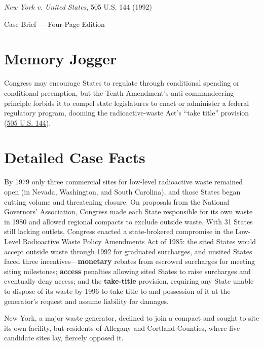 \documentclass[12pt]{article}
\begin{document}
\begin{center}
{\LARGE \textit{New York v. United States}, 505 U.S. 144 (1992)\par}
\vspace{0.8em}
{\large Case Brief --- Four-Page Edition\par}
\end{center}
\vspace{1em}

\section{Memory Jogger}

Congress may encourage States to regulate through conditional spending or conditional preemption, but the Tenth Amendment's anti-commandeering principle forbids it to compel state legislatures to enact or administer a federal regulatory program, dooming the radioactive-waste Act's ``take title'' provision (\href{https://www.courtlistener.com/opinion/112768/new-york-v-united-states/}{505 U.S. 144}).

\section{Detailed Case Facts}

By 1979 only three commercial sites for low-level radioactive waste remained open (in Nevada, Washington, and South Carolina), and those States began cutting volume and threatening closure. On proposals from the National Governors' Association, Congress made each State responsible for its own waste in 1980 and allowed regional compacts to exclude outside waste. With 31 States still lacking outlets, Congress enacted a state-brokered compromise in the Low-Level Radioactive Waste Policy Amendments Act of 1985: the sited States would accept outside waste through 1992 for graduated surcharges, and unsited States faced three incentives---\textbf{monetary} rebates from escrowed surcharges for meeting siting milestones; \textbf{access} penalties allowing sited States to raise surcharges and eventually deny access; and the \textbf{take-title} provision, requiring any State unable to dispose of its waste by 1996 to take title to and possession of it at the generator's request and assume liability for damages.

New York, a major waste generator, declined to join a compact and sought to site its own facility, but residents of Allegany and Cortland Counties, where five candidate sites lay, fiercely opposed it.
\end{document}
